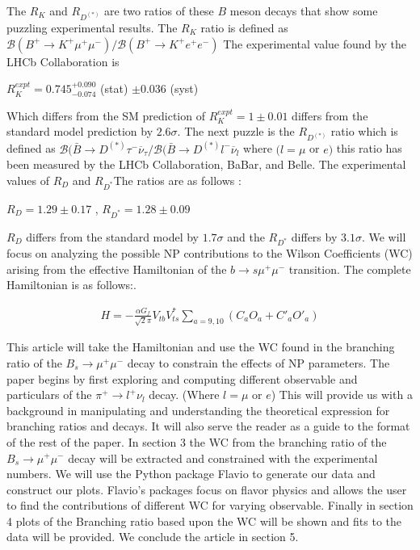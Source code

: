 \documentclass[12pt]{article}
\def \bea{\begin{eqnarray}}
\def \eea{\end{eqnarray}}
\def \onu{\overline{\nu}}
\def \si{\sigma}
\begin{document}
The $R_K$ and $R_{D^{(*)}}$ are two ratios of these $B$ meson decays that show some puzzling experimental results. The $R_K$ ratio is defined as $\mathcal{B}(B^+\rightarrow K^+\mu^+\mu^-)/ \mathcal{B}(B^+\rightarrow K^+e^+e^-)$ The experimental value found by the LHCb Collaboration is \cite{Aaij:2014ora}
\begin{center}
$R^{expt}_{K} = 0.745 _{\num{-0.074}}^{+0.090}$ (stat) $\pm 0.036$ (syst)
\end{center}
Which differs from the SM prediction of $R^{expt}_{K} = 1 \pm 0.01$ differs from the standard model prediction by $2.6\si$. \cite{Bordone:2016gaq} The next puzzle is the $R_{D^{(*)}}$ ratio which is defined as $\mathcal{B}(\bar{B} \rightarrow D^{(*)}\tau^- \onu_{\tau}/ \mathcal{B}(\bar{B} \rightarrow D^{(*)}l^- \onu_{l}$ where $(l= \mu$ or $e)$ this ratio has been measured by the LHCb  Collaboration, BaBar, and Belle. The experimental values of $R_D$ and $R_{D^*}$The ratios are as follows \cite{Lees:2013uzd, Huschle:2015rga, Aaij:2015yra} :
\begin{center}
$R_D= 1.29 \pm 0.17$ , $R_{D^*} = 1.28 \pm 0.09$
\end{center}$R_D$ differs from the standard model by $1.7\si$ and the $R_{D^*}$ differs by $3.1\si$. We will focus on analyzing the possible NP contributions to the Wilson Coefficients (WC) arising from the effective Hamiltonian of the $b \rightarrow s\mu^+\mu^-$ transition. The complete Hamiltonian is as follows:\cite{Bhattacharya:2016mcc}. 
\begin{center}
\bea
H = -\frac{\alpha G_f}{\sqrt{2}\pi} V_{tb}V^*_{ts}\sum_{a= 9,10}^{}(C_aO_a + C'_aO'_a)
\eea
\end{center}
This article will take the Hamiltonian and use the WC found in the branching ratio of the $B_s \rightarrow \mu^+ \mu^- $ decay to constrain the effects of NP parameters. The paper begins by first exploring and computing different observable and particulars of the $\pi^+ \rightarrow l^+ \nu_l $ decay. (Where $l= \mu$ or $e$) This will provide us with a background in manipulating and understanding the theoretical expression for branching ratios and decays. It will also serve the reader as a guide to the format of the rest of the paper. In section 3 the WC from the branching ratio of the $B_s \rightarrow \mu^+\mu^-$ decay will be extracted and constrained with the experimental numbers. We will use the Python package Flavio\cite{flavio} to generate our data and construct our plots. Flavio's packages focus on flavor physics and allows the user to find the contributions of different WC for varying observable. Finally in section 4 plots of the Branching ratio based upon the WC will be shown and fits to the data will be provided. We conclude the article in section 5.
\end{document}
